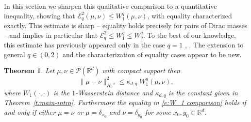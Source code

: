 \documentclass[12pt,a4paper,oneside]{amsart}
\theoremstyle{plain}
\newtheorem{theorem}{Theorem}[section]
\theoremstyle{definition}
\numberwithin{equation}{section}
\numberwithin{figure}{section}
\numberwithin{table}{section}
\theoremstyle{remark}
\newcommand{\R}{\mathbb{R}}
\begin{document}
In this section we sharpen this qualitative 
comparison to a quantitative inequality, showing that  $\mathcal{E}_q^2(\mu,\nu) \leq  W_1^q(\mu,\nu)$, with equality  characterized exactly. This estimate is sharp -- equality holds precisely  for pairs of Dirac masses -- and implies in particular that  $\mathcal{E}_q^2 \leq  W_1^q \leq  W_q^q$. To the best of our knowledge, this estimate has previously appeared only in the case $q = 1$ \cite[Theorem~2]{hertrich2024generative}, \cite[Lemma~5]{hagemann2024posterior}. The extension to general $q \in (0,2)$ and the characterization of equality cases appear to be new.
\begin{theorem}\label{thm:W1}
 Let $\mu,\nu \in \mathcal{P}(\R^d)$ with compact support then 
 \begin{equation}\label{e:W_1 comparison}
     \|\mu-\nu\|^2_{H_0^{-s}}\leq \kappa_{d,q}\; W^q_1(\mu,\nu),
 \end{equation}
 where $W_1(\cdot,\cdot)$ is the $1$-Wasserstein distance and $\kappa_{d,q}$ is the constant given in Theorem~\ref{t:main-intro}. 
 Furthermore the equality in \eqref{e:W_1 comparison} holds if and only if either $\mu=\nu$ or $\mu=\delta_{x_0}$ and $\nu=\delta_{y_0}$ for some $x_0,y_0\in \R^d$.
\end{theorem}
\end{document}
